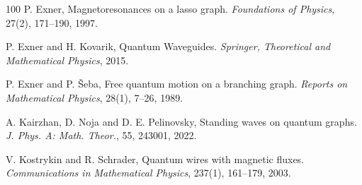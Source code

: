 \documentclass[12pt,a4paper]{amsart}
\theoremstyle{definition}
\theoremstyle{plain}
\numberwithin{equation}{section}
\begin{document}
\begin{thebibliography}{100}
{\sc P. Exner}, Magnetoresonances on a lasso graph. {\em Foundations of Physics}, 27(2), 171--190, 1997.

{\sc P. Exner and H. Kovarik}, Quantum Waveguides. {\em Springer, Theoretical and Mathematical Physics}, 2015.

{\sc P. Exner and P. Šeba}, Free quantum motion on a branching graph. {\em Reports on Mathematical Physics}, 28(1), 7--26, 1989.




{\sc A. Kairzhan, D. Noja and D. E. Pelinovsky}, Standing waves on quantum graphs. {\em J. Phys. A: Math. Theor.}, 55, 243001, 2022.


{\sc V. Kostrykin and R. Schrader}, Quantum wires with magnetic fluxes. {\em Communications in Mathematical Physics}, 237(1), 161--179, 2003.






\end{thebibliography}
\end{document}
